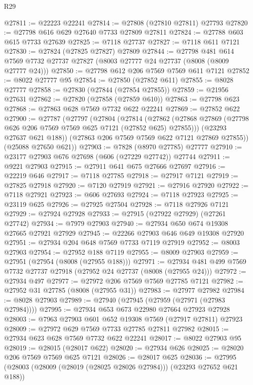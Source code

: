 \begin{lexlean}{R29}
\begin{coremodule}
@27811 := @22223 @22241
@27814 := @27808 (@27810 @27811) @27793
@27820 := @27798 @616 @629 @27640 @7733 @27809 @27811
@27824 := @27788 @603 @615 @7733 @27639
@27825 := @7118 @27737
@27827 := @7118 @611 @7121
@27830 := @27824 (@27825 @27827) @27809
@27844 := @27798
    @481
    @614
    @7569
    @7732
    @27737
    @27827
    (@8003 @27777 @24 @27737 (@8008 (@8009 @27777 @24)))
@27850 := @27798 @612 @206 @7569 @7569 @611 @7121
@27852 := @8022 @27777 @95
@27854 := @27850 (@27852 @611)
@27855 := @8028 @27777
@27858 := @27830 (@27844 (@27854 @27855))
@27859 := @21956 @27631
@27862 := @27820 (@27858 (@27859 @610))
@27863 := @27798 @623
@27868 := @27863 @628 @7569 @7732 @622 @22241
@27869 := @27852 @622
@27900 := @27787
    (@27797
      (@27804
        (@27814
          (@27862 (@27868 @27869 (@27798 @626 @206 @7569 @7569 @625 @7121 (@27852 @625) @27855)))
          (@23293 @27637 @621 @188))
        (@27863 @206 @7569 @7569 @622 @7121 @27869 @27855))
      (@25088 @27650 @621))
@27903 := @7828 (@8970 @27785) @27777
@27910 := @23177 @27903 @676 @27698 (@606 (@27229 @27742)) @27744
@27911 := @9221 @27903
@27915 := @27911 @641 @675 @27666 @27697
@27916 := @22219 @646
@27917 := @7118 @27785
@27918 := @27917 @7121
@27919 := @27825 @27918
@27920 := @7120 @27919
@27921 := @27916 @27920
@27922 := @7118 @27921
@27923 := @606 @27693
@27924 := @7118 @27923
@27925 := @23119 @625
@27926 := @27925 @27504
@27928 := @7118 @27926 @7121
@27929 := @27924 @27928
@27933 := @27915 (@27922 @27929) (@27261 @27742)
@27934 := @7979 @27903
@27940 := @27934 @650 @674 @19308 @27665 @27921 @27929
@27945 := @22266 @27903 @646 @649 @19308 @27920
@27951 := @27934 @204 @648 @7569 @7733 @7119 @27919
@27952 := @8003 @27903
@27954 := @27952 @188 @7119
@27955 := @8009 @27903
@27959 := @27951 (@27954 (@8008 (@27955 @188)))
@27971 := @27934 @481 @499 @7569 @7732 @27737 @27918 (@27952 @24 @27737 (@8008 (@27955 @24)))
@27972 := @27934 @497
@27977 := @27972 @206 @7569 @7569 @27785 @7121
@27982 := @27952 @31 @27785 (@8008 (@27955 @31))
@27983 := @27977 @27982
@27984 := @8028 @27903
@27989 := @27940 (@27945 (@27959 (@27971 (@27983 @27984))))
@27995 := @27934 @653 @673 @22980 @27664 @27923 @27928
@28003 := @7963 @27903 @601 @652 @19308 @7569 (@27917 @27811) @27923
@28009 := @27972 @629 @7569 @7733 @27785 @27811 @27982
@28015 := @27934 @623 @628 @7569 @7732 @622 @22241
@28017 := @8022 @27903 @95
@28019 := @28015 (@28017 @622)
@28020 := @27934 @626
@28025 := @28020 @206 @7569 @7569 @625 @7121
@28026 := @28017 @625
@28036 := @27995 (@28003 (@28009 (@28019 (@28025 @28026 @27984))) (@23293 @27652 @621 @188))

\end{coremodule}
\end{lexlean}
